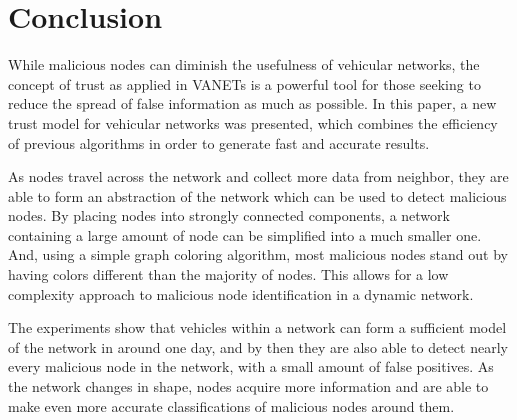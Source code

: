 \documentclass[conference]{IEEEtran}
\begin{document}
\section{Conclusion}
\label{section:conclusion}

While malicious nodes can diminish the usefulness of vehicular networks, the concept of trust as applied in VANETs is a powerful tool for those seeking to reduce the spread of false information as much as possible.
In this paper, a new trust model for vehicular networks was presented, which combines the efficiency of previous algorithms in order to generate fast and accurate results.

As nodes travel across the network and collect more data from neighbor, they are able to form an abstraction of the network which can be used to detect malicious nodes.
By placing nodes into strongly connected components, a network containing a large amount of node can be simplified into a much smaller one.
And, using a simple graph coloring algorithm, most malicious nodes stand out by having colors different than the majority of nodes.
This allows for a low complexity approach to malicious node identification in a dynamic network.

The experiments show that vehicles within a network can form a sufficient model of the network in around one day, and by then they are also able to detect nearly every malicious node in the network, with a small amount of false positives.
As the network changes in shape, nodes acquire more information and are able to make even more accurate classifications of malicious nodes around them.



%
%





\end{document}
